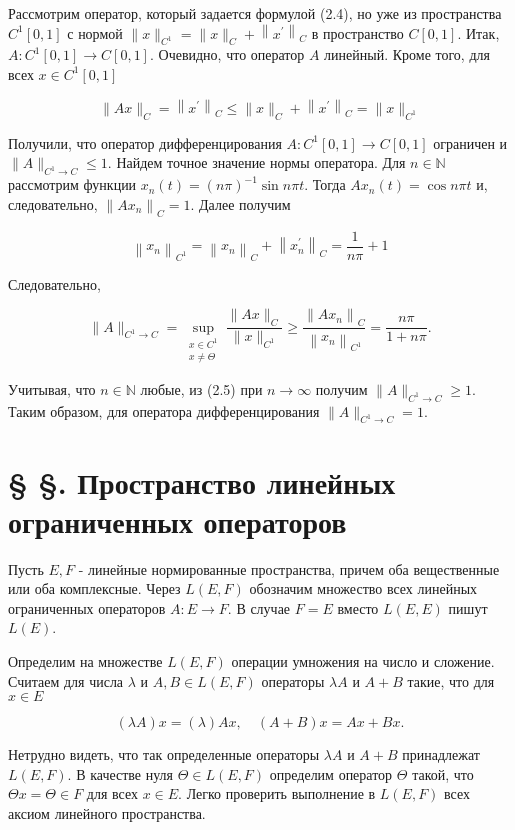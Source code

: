Рассмотрим оператор, который задается формулой (2.4), но уже из пространства $C^{1}[0,1]$ с нормой $\|x\|_{C^{1}}=\|x\|_{C}+\left\|x^{\prime}\right\|_{C}$ в пространство $C[0,1]$. Итак, $A: C^{1}[0,1] \rightarrow C[0,1]$. Очевидно, что оператор $A$ линейный. Кроме того, для всех $x \in C^{1}[0,1]$

$$
	\|A x\|_{C}=\left\|x^{\prime}\right\|_{C} \leq\|x\|_{C}+\left\|x^{\prime}\right\|_{C}=\|x\|_{C^{1}}
$$

Получили, что оператор дифференцирования $A: C^{1}[0,1] \rightarrow C[0,1]$ ограничен и $\|A\|_{C^{1} \rightarrow C} \leq 1$. Найдем точное значение нормы оператора. Для $n \in \mathbb{N}$ рассмотрим функции $x_{n}(t)=(n \pi)^{-1} \sin n \pi t$. Тогда $A x_{n}(t)=\cos n \pi t$ и, следовательно, $\left\|A x_{n}\right\|_{C}=1$. Далее получим

$$
	\left\|x_{n}\right\|_{C^{1}}=\left\|x_{n}\right\|_{C}+\left\|x_{n}^{\prime}\right\|_{C}=\frac{1}{n \pi}+1
$$

Следовательно,

$$
	\|A\|_{C^{1} \rightarrow C}=\sup _{\substack{x \in C^{1} \\ x \neq \Theta}} \frac{\|A x\|_{C}}{\|x\|_{C^{1}}} \geq \frac{\left\|A x_{n}\right\|_{C}}{\left\|x_{n}\right\|_{C^{1}}}=\frac{n \pi}{1+n \pi} .
$$

Учитывая, что $n \in \mathbb{N}$ любые, из (2.5) при $n \rightarrow \infty$ получим $\|A\|_{C^{1} \rightarrow C} \geq 1$. Таким образом, для оператора дифференцирования $\|A\|_{C^{1} \rightarrow C}=1$.


\section*{§ §. Пространство линейных ограниченных операторов}
Пусть $E, F$ - линейные нормированные пространства, причем оба вещественные или оба комплексные. Через $L(E, F)$ обозначим множество всех линейных ограниченных операторов $A: E \rightarrow F$. В случае $F=E$ вместо $L(E, E)$ пишут $L(E)$.

Определим на множестве $L(E, F)$ операции умножения на число и сложение. Считаем для числа $\lambda$ и $A, B \in L(E, F)$ операторы $\lambda A$ и $A+B$ такие, что для $x \in E$

$$
	(\lambda A) x=(\lambda) A x, \quad(A+B) x=A x+B x .
$$

Нетрудно видеть, что так определенные операторы $\lambda A$ и $A+B$ принадлежат $L(E, F)$. В качестве нуля $\Theta \in L(E, F)$ определим оператор $\Theta$ такой, что $\Theta x=\Theta \in F$ для всех $x \in E$. Легко проверить выполнение в $L(E, F)$ всех аксиом линейного пространства.

